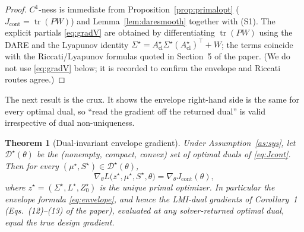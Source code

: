 \documentclass[11pt]{article}
\newtheorem{theorem}{Theorem}
\theoremstyle{definition}
\DeclareMathOperator{\tr}{tr}
\newcommand{\Acl}{A_{\mathrm{cl}}}
\newcommand{\Th}{\theta}
\newcommand{\Sig}{\Sigma}
\begin{document}
\begin{proof}
$C^1$-ness is immediate from Proposition~\ref{prop:primalopt}
($J_{\mathrm{cont}}=\tr(PW)$) and Lemma~\ref{lem:daresmooth} together with (S1).
The explicit partials \eqref{eq:gradV} are obtained by differentiating
$\tr(PW)$ using the DARE and the Lyapunov identity
$\Sig^\star=\Acl^\star\Sig^\star(\Acl^\star)^\top+W$; the terms coincide with the
Riccati/Lyapunov formulas quoted in Section~5 of the paper. (We do not use
\eqref{eq:gradV} below; it is recorded to confirm the envelope and Riccati routes
agree.)
\end{proof}

The next result is the crux. It shows the envelope right-hand side is the same
for every optimal dual, so ``read the gradient off the returned dual'' is valid
irrespective of dual non-uniqueness.

\begin{theorem}[Dual-invariant envelope gradient]\label{thm:invariant}
Under Assumption~\ref{as:sys}, let $\mathcal D^\star(\Th)$ be the
\textup{(}nonempty, compact, convex\textup{)} set of optimal duals of
\eqref{eq:Jcont}. Then for every $(\mu^\star,S^\star)\in\mathcal D^\star(\Th)$,
\begin{equation}\label{eq:invariant}
\nabla_\Th L\big(z^\star,\mu^\star,S^\star,\Th\big)
=\nabla_\Th J_{\mathrm{cont}}(\Th),
\end{equation}
where $z^\star=(\Sig^\star,L^\star,Z_0^\star)$ is the unique primal optimizer.
In particular the envelope formula \eqref{eq:envelope}, and hence the LMI-dual
gradients of Corollary~1 \textup{(}Eqs.~(12)--(13) of the paper\textup{)},
evaluated at \emph{any} solver-returned optimal dual, equal the true design
gradient.
\end{theorem}
\end{document}
